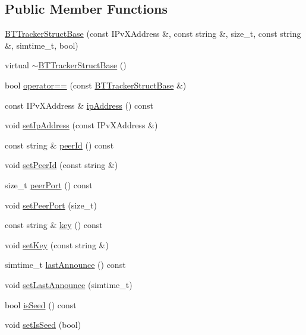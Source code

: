 \subsection*{Public Member Functions}
\begin{DoxyCompactItemize}
\item 
\hyperlink{classBTTrackerStructBase_a95263b3a44785f5ae58d4b4a8c0df889}{B\+T\+Tracker\+Struct\+Base} (const I\+Pv\+X\+Address \&, const string \&, size\+\_\+t, const string \&, simtime\+\_\+t, bool)
\item 
virtual \hyperlink{classBTTrackerStructBase_afbbc4194414fbe329ac2ffdb51e275f3}{$\sim$\+B\+T\+Tracker\+Struct\+Base} ()
\item 
bool \hyperlink{classBTTrackerStructBase_ac66964e8d8aad0678e5cf4364e99e90a}{operator==} (const \hyperlink{classBTTrackerStructBase}{B\+T\+Tracker\+Struct\+Base} \&)
\item 
const I\+Pv\+X\+Address \& \hyperlink{classBTTrackerStructBase_a98c29d3c64e02abdf592f9ad5ebc17b9}{ip\+Address} () const 
\item 
void \hyperlink{classBTTrackerStructBase_a4c2b84fb03388f33c1bfba42a14699a9}{set\+Ip\+Address} (const I\+Pv\+X\+Address \&)
\item 
const string \& \hyperlink{classBTTrackerStructBase_a93ee55a9c781903b6c2e2b665644580e}{peer\+Id} () const 
\item 
void \hyperlink{classBTTrackerStructBase_aa1df5beeeae37a93dea7b43c7c41e7a7}{set\+Peer\+Id} (const string \&)
\item 
size\+\_\+t \hyperlink{classBTTrackerStructBase_a2e453a4184d1b5ccaffbd128e3200168}{peer\+Port} () const 
\item 
void \hyperlink{classBTTrackerStructBase_a5380c7171b602657292d67f0a0644d59}{set\+Peer\+Port} (size\+\_\+t)
\item 
const string \& \hyperlink{classBTTrackerStructBase_a83ddbacdb11939b5c095e6fe8d4b3f4b}{key} () const 
\item 
void \hyperlink{classBTTrackerStructBase_a250522b23b74a585f1aaa452388db9d6}{set\+Key} (const string \&)
\item 
simtime\+\_\+t \hyperlink{classBTTrackerStructBase_a4ed22a465e65d8cea953d7a43e627c3a}{last\+Announce} () const 
\item 
void \hyperlink{classBTTrackerStructBase_ae4da4c1e130b373de29c28147c13217c}{set\+Last\+Announce} (simtime\+\_\+t)
\item 
bool \hyperlink{classBTTrackerStructBase_ad3793c0dc86881a076708bcb895d3c2d}{is\+Seed} () const 
\item 
void \hyperlink{classBTTrackerStructBase_ab7f248b9287269b8074b2cac4d377f31}{set\+Is\+Seed} (bool)
\end{DoxyCompactItemize}
